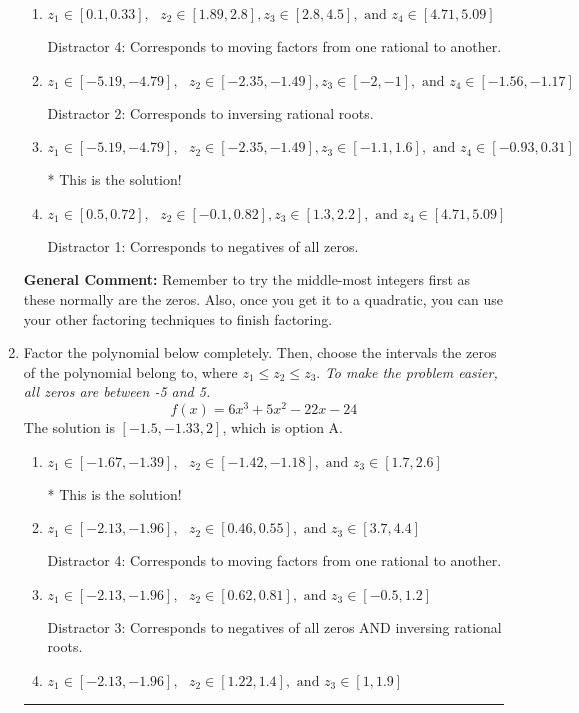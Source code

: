 \documentclass{extbook}[14pt]
\newcommand{\litem}[1]{\item #1

\rule{\textwidth}{0.4pt}}
\begin{document}
\begin{enumerate}
{\begin{enumerate}[label=\Alph*.]
 Distractor 3: Corresponds to negatives of all zeros AND inversing rational roots.
\item \( z_1 \in [0.1, 0.33], \text{   }  z_2 \in [1.89, 2.8], z_3 \in [2.8, 4.5], \text{   and   } z_4 \in [4.71, 5.09] \)

 Distractor 4: Corresponds to moving factors from one rational to another.
\item \( z_1 \in [-5.19, -4.79], \text{   }  z_2 \in [-2.35, -1.49], z_3 \in [-2, -1], \text{   and   } z_4 \in [-1.56, -1.17] \)

 Distractor 2: Corresponds to inversing rational roots.
\item \( z_1 \in [-5.19, -4.79], \text{   }  z_2 \in [-2.35, -1.49], z_3 \in [-1.1, 1.6], \text{   and   } z_4 \in [-0.93, 0.31] \)

* This is the solution!
\item \( z_1 \in [0.5, 0.72], \text{   }  z_2 \in [-0.1, 0.82], z_3 \in [1.3, 2.2], \text{   and   } z_4 \in [4.71, 5.09] \)

 Distractor 1: Corresponds to negatives of all zeros.
\end{enumerate}

\textbf{General Comment:} Remember to try the middle-most integers first as these normally are the zeros. Also, once you get it to a quadratic, you can use your other factoring techniques to finish factoring.
}
\litem{
Factor the polynomial below completely. Then, choose the intervals the zeros of the polynomial belong to, where $z_1 \leq z_2 \leq z_3$. \textit{To make the problem easier, all zeros are between -5 and 5.}
\[ f(x) = 6x^{3} +5 x^{2} -22 x -24 \]The solution is \( [-1.5, -1.33, 2] \), which is option A.\begin{enumerate}[label=\Alph*.]
\item \( z_1 \in [-1.67, -1.39], \text{   }  z_2 \in [-1.42, -1.18], \text{   and   } z_3 \in [1.7, 2.6] \)

* This is the solution!
\item \( z_1 \in [-2.13, -1.96], \text{   }  z_2 \in [0.46, 0.55], \text{   and   } z_3 \in [3.7, 4.4] \)

 Distractor 4: Corresponds to moving factors from one rational to another.
\item \( z_1 \in [-2.13, -1.96], \text{   }  z_2 \in [0.62, 0.81], \text{   and   } z_3 \in [-0.5, 1.2] \)

 Distractor 3: Corresponds to negatives of all zeros AND inversing rational roots.
\item \( z_1 \in [-2.13, -1.96], \text{   }  z_2 \in [1.22, 1.4], \text{   and   } z_3 \in [1, 1.9] \)


\end{enumerate}}
\end{enumerate}
\end{document}
